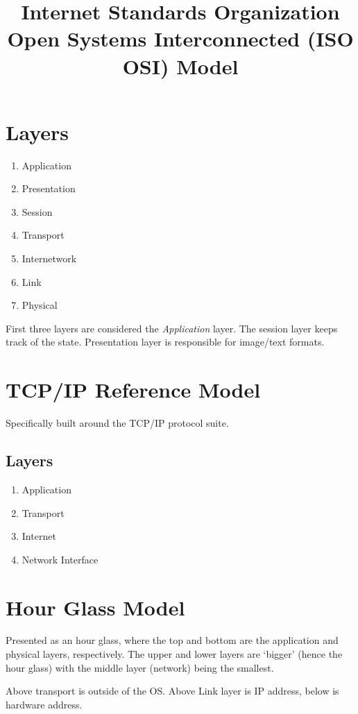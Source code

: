 \documentclass{article}
\title{Internet Standards Organization Open Systems Interconnected (ISO OSI) Model}
\begin{document}
\maketitle

\section*{Layers}
\begin{enumerate}
    \item Application
    \item Presentation
    \item Session
    \item Transport
    \item Internetwork
    \item Link
    \item Physical
\end{enumerate}

First three layers are considered the \emph{Application} layer.
The session layer keeps track of the state.
Presentation layer is responsible for image/text formats.

\section*{TCP/IP Reference Model}
Specifically built around the TCP/IP protocol suite.

\subsection*{Layers}
\begin{enumerate}
    \item Application
    \item Transport
    \item Internet
    \item Network Interface
\end{enumerate}

\section*{Hour Glass Model}
Presented as an hour glass, where the top and bottom are the application and
physical layers, respectively. The upper and lower layers are `bigger' (hence
the hour glass) with the middle layer (network) being the smallest.

Above transport is outside of the OS.
Above Link layer is IP address, below is hardware address.
\end{document}
